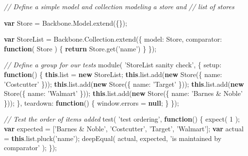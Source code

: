 \documentclass[9pt]{book}
\newenvironment{Shaded}{}{}
\newcommand{\KeywordTok}[1]{\textcolor[rgb]{0.00,0.44,0.13}{\textbf{{#1}}}}
\newcommand{\DataTypeTok}[1]{\textcolor[rgb]{0.56,0.13,0.00}{{#1}}}
\newcommand{\DecValTok}[1]{\textcolor[rgb]{0.25,0.63,0.44}{{#1}}}
\newcommand{\StringTok}[1]{\textcolor[rgb]{0.25,0.44,0.63}{{#1}}}
\newcommand{\CommentTok}[1]{\textcolor[rgb]{0.38,0.63,0.69}{\textit{{#1}}}}
\newcommand{\OtherTok}[1]{\textcolor[rgb]{0.00,0.44,0.13}{{#1}}}
\newcommand{\FunctionTok}[1]{\textcolor[rgb]{0.02,0.16,0.49}{{#1}}}
\newcommand{\NormalTok}[1]{{#1}}
\begin{document}
\begin{Shaded}
\begin{Highlighting}[]
\CommentTok{// Define a simple model and collection modeling a store and}
\CommentTok{// list of stores}

\KeywordTok{var} \NormalTok{Store = }\OtherTok{Backbone}\NormalTok{.}\OtherTok{Model}\NormalTok{.}\FunctionTok{extend}\NormalTok{(\{\});}

\KeywordTok{var} \NormalTok{StoreList = }\OtherTok{Backbone}\NormalTok{.}\OtherTok{Collection}\NormalTok{.}\FunctionTok{extend}\NormalTok{(\{}
    \DataTypeTok{model}\NormalTok{: Store,}
    \DataTypeTok{comparator}\NormalTok{: }\KeywordTok{function}\NormalTok{( Store ) \{ }\KeywordTok{return} \OtherTok{Store}\NormalTok{.}\FunctionTok{get}\NormalTok{(}\StringTok{'name'}\NormalTok{) \}}
\NormalTok{\});}

\CommentTok{// Define a group for our tests}
\FunctionTok{module}\NormalTok{( }\StringTok{'StoreList sanity check'}\NormalTok{, \{}
    \DataTypeTok{setup}\NormalTok{: }\KeywordTok{function}\NormalTok{() \{}
        \KeywordTok{this}\NormalTok{.}\FunctionTok{list} \NormalTok{= }\KeywordTok{new} \NormalTok{StoreList;}
        \KeywordTok{this}\NormalTok{.}\OtherTok{list}\NormalTok{.}\FunctionTok{add}\NormalTok{(}\KeywordTok{new} \FunctionTok{Store}\NormalTok{(\{ }\DataTypeTok{name}\NormalTok{: }\StringTok{'Costcutter'} \NormalTok{\}));}
        \KeywordTok{this}\NormalTok{.}\OtherTok{list}\NormalTok{.}\FunctionTok{add}\NormalTok{(}\KeywordTok{new} \FunctionTok{Store}\NormalTok{(\{ }\DataTypeTok{name}\NormalTok{: }\StringTok{'Target'} \NormalTok{\}));}
        \KeywordTok{this}\NormalTok{.}\OtherTok{list}\NormalTok{.}\FunctionTok{add}\NormalTok{(}\KeywordTok{new} \FunctionTok{Store}\NormalTok{(\{ }\DataTypeTok{name}\NormalTok{: }\StringTok{'Walmart'} \NormalTok{\}));}
        \KeywordTok{this}\NormalTok{.}\OtherTok{list}\NormalTok{.}\FunctionTok{add}\NormalTok{(}\KeywordTok{new} \FunctionTok{Store}\NormalTok{(\{ }\DataTypeTok{name}\NormalTok{: }\StringTok{'Barnes & Noble'} \NormalTok{\}));}
    \NormalTok{\},}
    \DataTypeTok{teardown}\NormalTok{: }\KeywordTok{function}\NormalTok{() \{}
        \OtherTok{window}\NormalTok{.}\FunctionTok{errors} \NormalTok{= }\KeywordTok{null}\NormalTok{;}
    \NormalTok{\}}
\NormalTok{\});}

\CommentTok{// Test the order of items added}
\FunctionTok{test}\NormalTok{( }\StringTok{'test ordering'}\NormalTok{, }\KeywordTok{function}\NormalTok{() \{}
    \FunctionTok{expect}\NormalTok{( }\DecValTok{1} \NormalTok{);}
    \KeywordTok{var} \NormalTok{expected = [}\StringTok{'Barnes & Noble'}\NormalTok{, }\StringTok{'Costcutter'}\NormalTok{, }\StringTok{'Target'}\NormalTok{, }\StringTok{'Walmart'}\NormalTok{];}
    \KeywordTok{var} \NormalTok{actual = }\KeywordTok{this}\NormalTok{.}\OtherTok{list}\NormalTok{.}\FunctionTok{pluck}\NormalTok{(}\StringTok{'name'}\NormalTok{);}
    \FunctionTok{deepEqual}\NormalTok{( actual, expected, }\StringTok{'is maintained by comparator'} \NormalTok{);}
\NormalTok{\});}
\end{Highlighting}
\end{Shaded}
\end{document}
